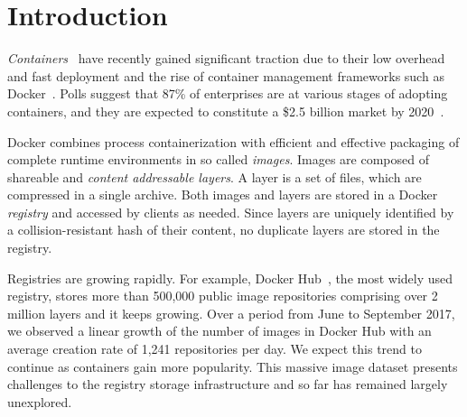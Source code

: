 \section{Introduction}

\emph{Containers}~\cite{process-containers-linux} have recently gained
significant traction due to their low overhead and fast deployment and
the rise of container management frameworks such as Docker~\cite{docker}.
%
Polls suggest that 87\% of enterprises are at various stages of adopting
containers, and they are expected to constitute a \$2.5 billion
market by 2020~\cite{container-grow-by2020}.

Docker combines process containerization with efficient and effective packaging
of complete runtime environments in so called {\em images}.
%
Images are composed of shareable and {\em content addressable layers}.
%
A layer is a set of files, which are compressed in a single archive.
%
Both images and layers are stored in a Docker \emph{registry} and accessed by
clients as needed.
%
Since layers are uniquely identified by a collision-resistant hash of
their content, no duplicate layers are stored in the registry.

Registries are growing rapidly.
%
For example, Docker Hub~\cite{docker-hub}, the most widely used registry,
stores more than 500,000 public image repositories comprising over 2 million
layers and it keeps growing.
%
Over a period from June to September 2017, we observed a linear growth of the number
of images in Docker Hub with an average creation rate of 1,241 repositories per day.
%
We expect this trend to continue as containers gain more popularity.
%
%
This massive image dataset presents challenges to the registry storage
infrastructure and so far has remained largely unexplored.

